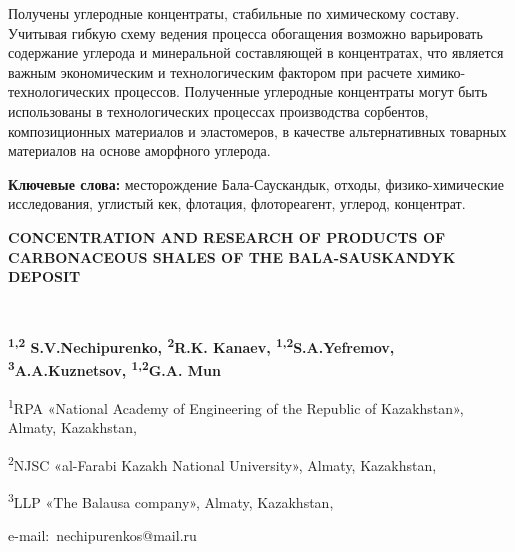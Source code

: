 Получены углеродные концентраты, стабильные по химическому составу.
Учитывая гибкую схему ведения процесса обогащения возможно варьировать
содержание углерода и минеральной составляющей в концентратах, что
является важным экономическим и технологическим фактором при расчете
химико-технологических процессов. Полученные углеродные концентраты
могут быть использованы в технологических процессах производства
сорбентов, композиционных материалов и эластомеров, в качестве
альтернативных товарных материалов на основе аморфного углерода.

{\bfseries Ключевые слова:} месторождение Бала-Саускандык, отходы,
физико-химические исследования, углистый кек, флотация, флотореагент,
углерод, концентрат.

{\bfseries CONCENTRATION AND RESEARCH OF PRODUCTS OF CARBONACEOUS SHALES OF
THE BALA-SAUSKANDYK DEPOSIT}

~

{\bfseries \textsuperscript{1,2} S.V.Nechipurenko, \textsuperscript{2}R.K.
Kanaev, \textsuperscript{1,2}S.A.Yefremov,
\textsuperscript{3}A.A.Kuznetsov, \textsuperscript{1,2}G.A. Mun}

\textsuperscript{1}RPA «National Academy of Engineering of the Republic
of Kazakhstan», Almaty, Kazakhstan,

\textsuperscript{2}NJSC «al-Farabi Kazakh National University», Almaty,
Kazakhstan,

\textsuperscript{3}LLP «The Balausa company», Almaty, Kazakhstan,

e-mail:~nechipurenkos@mail.ru

~

